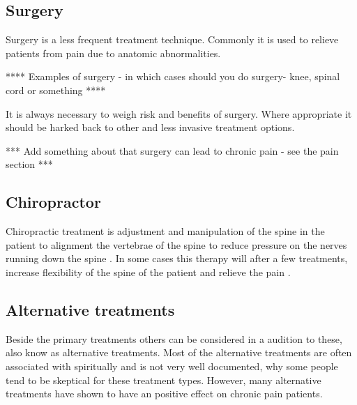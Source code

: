 \subsection{Surgery}
Surgery is a less frequent treatment technique. Commonly it is used to relieve patients from pain due to anatomic abnormalities. \cite{marcus2009,pope2017} 

**** Examples of surgery - in which cases should you do surgery- knee, spinal cord or something ****

It is always necessary to weigh risk and benefits of surgery. Where appropriate it should be harked back to other and less invasive treatment options. \cite{pope2017}

*** Add something about that surgery can lead to chronic pain - see the pain section ***


\subsection{Chiropractor}
Chiropractic treatment is adjustment and manipulation of the spine in the patient to alignment the vertebrae of the spine to reduce pressure on the nerves running down the spine \cite{Gerald2013}. In some cases this therapy will after a few treatments, increase flexibility of the spine of the patient and relieve the pain \cite{Peterson2012}.

\subsection{Alternative treatments}
Beside the primary treatments others can be considered in a audition to these, also know as alternative treatments. Most of the alternative treatments are often associated with spiritually and is not very well documented, why some people tend to be skeptical for these treatment types. However, many alternative treatments have shown to have an positive effect on chronic pain patients.

